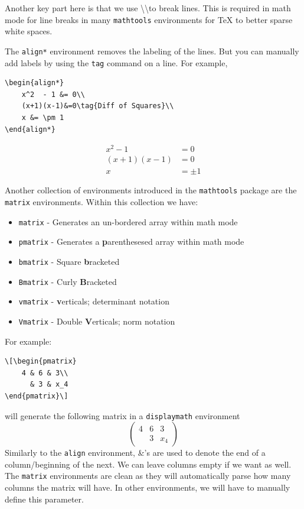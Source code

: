 \documentclass[twocolumn]{article}
\begin{document}
Another key part here is that we use \textbackslash\textbackslash to break lines. This is required in math mode for line breaks in many \verb|mathtools| environments for TeX to better sparse white spaces.

The \verb|align*| environment removes the labeling of the lines. But you can manually add labels by using the \verb|tag| command on a line. For example,
\begin{verbatim}
\begin{align*}
    x^2  - 1 &= 0\\
    (x+1)(x-1)&=0\tag{Diff of Squares}\\
    x &= \pm 1
\end{align*}
\end{verbatim}
\begin{align*}
    x^2  - 1 &= 0\\
    (x+1)(x-1)&=0\tag{Diff of Squares}\\
    x &= \pm 1
\end{align*}

Another collection of environments introduced in the \verb|mathtools| package are the \verb|matrix| environments. Within this collection we have:\begin{itemize}
    \item \verb|matrix| - Generates an un-bordered array within math mode
    \item \verb|pmatrix| - Generates a \textbf{p}arenthesesed array within math mode
    \item \verb|bmatrix| - Square \textbf{b}racketed
    \item \verb|Bmatrix| - Curly \textbf{B}racketed
    \item \verb|vmatrix| - \textbf{v}erticals; determinant notation
    \item \verb|Vmatrix| - Double \textbf{V}erticals; norm notation
\end{itemize}
For example:
\begin{verbatim}
\[\begin{pmatrix}
    4 & 6 & 3\\
      & 3 & x_4
\end{pmatrix}\]
\end{verbatim}

will generate the following matrix in a \verb|displaymath| environment
\[\begin{pmatrix}
    4 & 6 & 3\\
      & 3 & x_4
\end{pmatrix}\]
Similarly to the \verb|align| environment, \&'s are used to denote the end of a column/beginning of the next. We can leave columns empty if we want as well. The \verb|matrix| environments are clean as they will automatically parse how many columns the matrix will have. In other environments, we will have to manually define this parameter.
\end{document}
